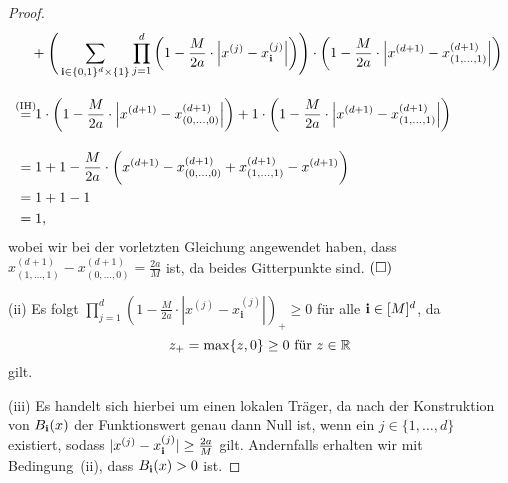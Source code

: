 \begin{proof}
\begin{equation*}
\begin{split}
& \quad + \Bigg(\sum_{\mathbf{i} \in \{0, 1\}^d \times \{1\}} \prod_{j = 1}^{d} \bigg(1 - \frac{M}{2a} \cdot \Big|x^{(j)} - x_{\bi}^{(j)}\Big|\bigg)\Bigg) \cdot \bigg(1 - \frac{M}{2a} \cdot \Big|x^{(d + 1)} - x_{(1,\dots,1)}^{(d + 1)}\Big|\bigg) \\[1em]
& \stackrel{\mathmakebox[\widthof{=}]{\text{(IH)}}}{=} 1 \cdot \bigg(1 - \frac{M}{2a} \cdot \Big|x^{(d + 1)} - x_{(0,\dots,0)}^{(d + 1)}\Big|\bigg) + 1 \cdot \bigg(1 - \frac{M}{2a} \cdot \Big|x^{(d + 1)} - x_{(1,\dots,1)}^{(d + 1)}\Big|\bigg) \\[1em]
& = 1 + 1 - \frac{M}{2a} \cdot \bigg(x^{(d + 1)} - x_{(0,\dots,0)}^{(d + 1)} + x_{(1,\dots,1)}^{(d + 1)} - x^{(d + 1)}\bigg) \\
& = 1 + 1 - 1 \\
& = 1,
\end{split}
\end{equation*}
wobei wir bei der vorletzten Gleichung angewendet haben, dass $x_{(1,\dots,1)}^{(d + 1)} - x_{(0,\dots,0)}^{(d + 1)} = \frac{2a}{M}$ ist, da beides Gitterpunkte sind.  $\hfill(\square)$ 		

(ii) Es folgt $\prod_{j = 1}^d (1 - \frac{M}{2a} \cdot |x^{(j)} - x_{\mathbf{i}}^{(j)}|)_+ \geq 0$ für alle $\mathbf{i} \in [M]^d$, da $$z_+= \max\{z, 0\} \geq 0 \text{ für $z \in \mathbb{R}$}$$ gilt.

(iii) Es handelt sich hierbei um einen lokalen Träger, da nach der Konstruktion von $B_{\mathbf{i}}(x)$ der Funktionswert genau dann Null ist, wenn ein $j \in \{1,\dots, d\}$ existiert, sodass $|x^{(j)} - x_{\mathbf{i}}^{(j)}| \geq \frac{2a}{M}$ gilt. Andernfalls erhalten wir mit Bedingung~(ii), dass $B_{\mathbf{i}}(x) > 0$ ist. 
\end{proof}

